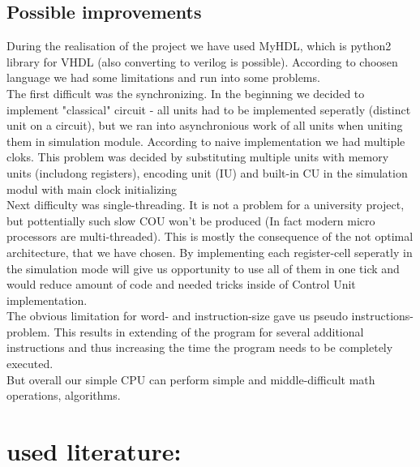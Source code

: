 \documentclass[11pt,a4paper]{article}
\begin{document}
\subsection{Possible improvements}
During the realisation of the project we have used MyHDL, which is python2 library for VHDL (also converting to verilog is possible). According to choosen language we had some limitations and run into some problems.\\
The first difficult was the synchronizing. In the beginning we decided to implement "classical" circuit - all units had to be implemented seperatly (distinct unit on a circuit), but we ran into asynchronious work of all units when uniting them in simulation module. According to naive implementation we had multiple cloks. This problem was decided by substituting multiple units with memory units (includong registers), encoding unit (IU) and built-in CU in the simulation modul with main clock initializing\\
Next difficulty was single-threading. It is not a problem for a university project, but pottentially such slow COU won't be produced (In fact modern micro processors are multi-threaded). This is mostly the consequence of the not optimal architecture, that we have chosen. By implementing each register-cell seperatly in the simulation mode will give us opportunity to use all of them in one tick and would reduce amount of code and needed tricks inside of Control Unit implementation.\\
The obvious limitation for word- and instruction-size gave us pseudo instructions-problem. This results in extending of the program for several additional instructions and thus increasing the time the program needs to be completely executed.\\
But overall our simple CPU can perform simple and middle-difficult math operations, algorithms. 

\newpage
\section*{used literature:}  
\end{document}
